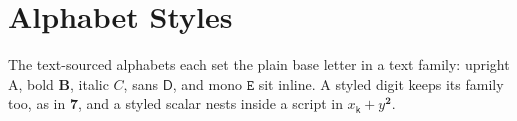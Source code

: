 \documentclass{article}
\begin{document}
\section{Alphabet Styles}

The text-sourced alphabets each set the plain base letter in a text family:
upright $\mathrm{A}$, bold $\mathbf{B}$, italic $\mathit{C}$, sans
$\mathsf{D}$, and mono $\mathtt{E}$ sit inline. A styled digit keeps its
family too, as in $\mathbf{7}$, and a styled scalar nests inside a script
in $x_{\mathsf{k}} + y^{\mathbf{2}}$.
\end{document}
